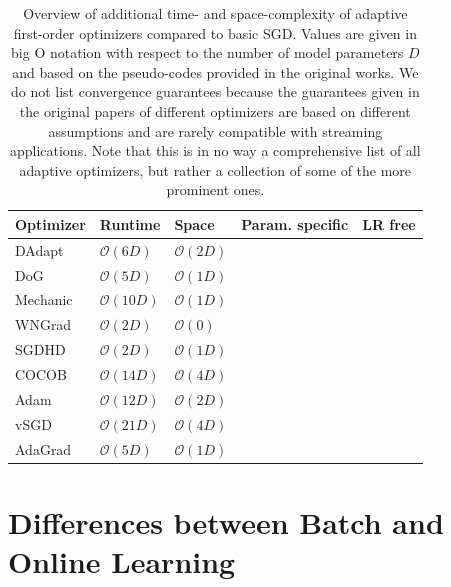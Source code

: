 \documentclass[letterpaper]{article} %
\newcommand{\cmark}{\ding{51}} %
\newcommand{\xmark}{\ding{55}} %
\begin{document}
\begin{table}[ht]
	\centering
	\small
	\begin{tabular}{@{}lllcc@{}}
		\toprule
		Optimizer & Runtime                         & Space             & Param. specific & LR free \\ \midrule
		DAdapt    & $\mathcal{O}(6D)$               & $\mathcal{O}(2D)$ & \xmark          & \cmark  \\
		DoG       & $\mathcal{O}(5D)$               & $\mathcal{O}(1D)$ & \xmark          & \cmark  \\
		Mechanic  & $\mathcal{O}(10D)$              & $\mathcal{O}(1D)$ & \xmark          & \cmark  \\
		WNGrad    & $\mathcal{O}(2D)$               & $\mathcal{O}(0)$  & \xmark          & \cmark  \\
		SGDHD     & $\mathcal{O}(2D)$               & $\mathcal{O}(1D)$ & \xmark          & \cmark  \\
		COCOB     & $\mathcal{O}(14D)$              & $\mathcal{O}(4D)$ & \cmark          & \cmark  \\
		Adam      & $\mathcal{O}(12D)$              & $\mathcal{O}(2D)$ & \cmark          & \xmark  \\
		vSGD      & $\mathcal{O}(21D)$\footnotemark & $\mathcal{O}(4D)$ & \cmark          & \cmark  \\ %
		AdaGrad   & $\mathcal{O}(5D)$               & $\mathcal{O}(1D)$ & \cmark          & \xmark  \\ \bottomrule
	\end{tabular}
	\caption{Overview of additional time- and space-complexity of adaptive first-order optimizers compared to basic SGD. Values are given in big O notation with respect to the number of model parameters $D$ and based on the pseudo-codes provided in the original works. We do not list convergence guarantees because the guarantees given in the original papers of different optimizers are based on different assumptions and are rarely compatible with streaming applications. Note that this is in no way a comprehensive list of all adaptive optimizers, but rather a collection of some of the more prominent ones.}\label{tab:param_free_optims}
\end{table}

\section{Differences between Batch and Online Learning}\label{sec:diffs_batch_online}
\end{document}
